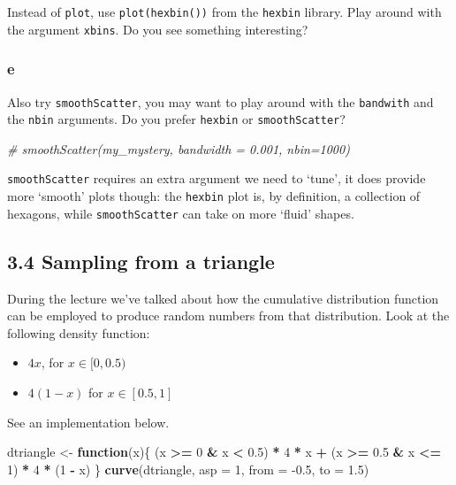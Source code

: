 \documentclass[]{article}
\newenvironment{Shaded}{\begin{snugshade}}{\end{snugshade}}
\newcommand{\CommentTok}[1]{\textcolor[rgb]{0.56,0.35,0.01}{\textit{#1}}}
\newcommand{\ControlFlowTok}[1]{\textcolor[rgb]{0.13,0.29,0.53}{\textbf{#1}}}
\newcommand{\DataTypeTok}[1]{\textcolor[rgb]{0.13,0.29,0.53}{#1}}
\newcommand{\DecValTok}[1]{\textcolor[rgb]{0.00,0.00,0.81}{#1}}
\newcommand{\FloatTok}[1]{\textcolor[rgb]{0.00,0.00,0.81}{#1}}
\newcommand{\KeywordTok}[1]{\textcolor[rgb]{0.13,0.29,0.53}{\textbf{#1}}}
\newcommand{\NormalTok}[1]{#1}
\newcommand{\OperatorTok}[1]{\textcolor[rgb]{0.81,0.36,0.00}{\textbf{#1}}}
\newcommand{\StringTok}[1]{\textcolor[rgb]{0.31,0.60,0.02}{#1}}
\providecommand{\tightlist}{%
  \setlength{\itemsep}{0pt}\setlength{\parskip}{0pt}}
\begin{document}
Instead of \texttt{plot}, use \texttt{plot(hexbin())} from the
\texttt{hexbin} library. Play around with the argument \texttt{xbins}.
Do you see something interesting?

\hypertarget{e-3}{%
\subsubsection{e}\label{e-3}}

Also try \texttt{smoothScatter}, you may want to play around with the
\texttt{bandwith} and the \texttt{nbin} arguments. Do you prefer
\texttt{hexbin} or \texttt{smoothScatter}?

\begin{Shaded}
\begin{Highlighting}[]
\CommentTok{# smoothScatter(my_mystery, bandwidth = 0.001, nbin=1000)}
\end{Highlighting}
\end{Shaded}

\texttt{smoothScatter} requires an extra argument we need to `tune', it
does provide more `smooth' plots though: the \texttt{hexbin} plot is, by
definition, a collection of hexagons, while \texttt{smoothScatter} can
take on more `fluid' shapes.

\hypertarget{sampling-from-a-triangle}{%
\subsection{3.4 Sampling from a
triangle}\label{sampling-from-a-triangle}}

During the lecture we've talked about how the cumulative distribution
function can be employed to produce random numbers from that
distribution. Look at the following density function:

\begin{itemize}
\tightlist
\item
  \(4x\), for \(x\in [0, 0.5)\)
\item
  \(4(1-x)\) for \(x\in [0.5, 1]\)
\end{itemize}

See an implementation below.

\begin{Shaded}
\begin{Highlighting}[]
\NormalTok{dtriangle <-}\StringTok{ }\ControlFlowTok{function}\NormalTok{(x)\{}
\NormalTok{  (x }\OperatorTok{>=}\StringTok{ }\DecValTok{0} \OperatorTok{&}\StringTok{ }\NormalTok{x }\OperatorTok{<}\StringTok{ }\FloatTok{0.5}\NormalTok{) }\OperatorTok{*}\StringTok{ }\DecValTok{4} \OperatorTok{*}\StringTok{ }\NormalTok{x }\OperatorTok{+}\StringTok{ }\NormalTok{(x }\OperatorTok{>=}\StringTok{ }\FloatTok{0.5} \OperatorTok{&}\StringTok{ }\NormalTok{x }\OperatorTok{<=}\StringTok{ }\DecValTok{1}\NormalTok{) }\OperatorTok{*}\StringTok{ }\DecValTok{4} \OperatorTok{*}\StringTok{ }\NormalTok{(}\DecValTok{1} \OperatorTok{-}\StringTok{ }\NormalTok{x)}
\NormalTok{\}}
\KeywordTok{curve}\NormalTok{(dtriangle, }\DataTypeTok{asp =} \DecValTok{1}\NormalTok{, }\DataTypeTok{from =} \FloatTok{-0.5}\NormalTok{, }\DataTypeTok{to =} \FloatTok{1.5}\NormalTok{)}
\end{Highlighting}
\end{Shaded}
\end{document}
